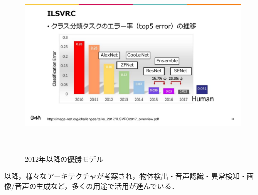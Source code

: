 \begin{figure} [H]
	\begin{center}
		\includegraphics[clip, height=9cm, bb=-200 0 1920 1080]{data/figure/ilsvrc_winner_2010-2017_with_algo.png}
		\caption{2012年以降の優勝モデル}
		\label{ilsvrc_winner_2010-2017_with_algo}
	\end{center}
\end{figure}

以降，様々なアーキテクチャが考案され，物体検出・音声認識・異常検知・画像/音声の生成など，多くの用途で活用が進んでいる．
